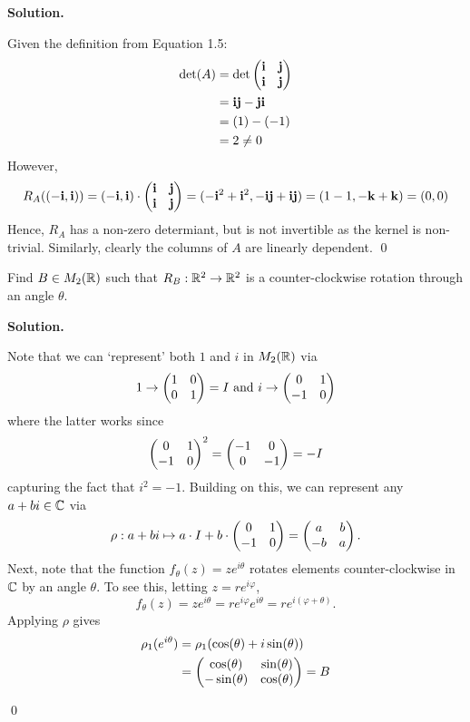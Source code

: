 \documentclass[12pt]{book}
\theoremstyle{definition}
\newenvironment{solution}
{%
  \par\noindent\textbf{Solution.}\quad
}
{%
  \qed\par
}
\begin{document}
\begin{solution}
  Given the definition from Equation 1.5:
  \[
    \begin{aligned}
      \det (A) &= \det \begin{pmatrix} \mathbf{i} & \mathbf{j} \\ \mathbf{i} & \mathbf{j} \end{pmatrix} \\
               &= \mathbf{i} \mathbf{j} - \mathbf{j} \mathbf{i} \\
               &= (1) - (-1) \\
               &= 2 \neq 0 \\
   \end{aligned}
  \]
  However,
  \[
  R_A((-\mathbf{i}, \mathbf{i})) = (-\mathbf{i}, \mathbf{i}) \cdot \begin{pmatrix} \mathbf{i} & \mathbf{j} \\ \mathbf{i} & \mathbf{j} \end{pmatrix} = (-\mathbf{i}^2 + \mathbf{i}^2, -\mathbf{i}\mathbf{j} + \mathbf{i}\mathbf{j}) = (1 - 1, -\mathbf{k} + \mathbf{k}) = (0, 0)
  \]
  Hence, $R_A$ has a non-zero determiant, but is not invertible as the kernel is non-trivial.
  Similarly, clearly the columns of $A$ are linearly dependent.
\end{solution}

\begin{taggedexercise}[\textcolor{green}{Complete}]
  Find $B \in M_2(\mathbb{R})$ such that $R_B : \mathbb{R}^2 \to \mathbb{R}^2$ is a counter-clockwise rotation through an angle $\theta$.
\end{taggedexercise}

\begin{solution}
  Note that we can `represent' both $1$ and $i$ in $M_2(\mathbb{R})$ via
  \[
  1 \to \begin{pmatrix} 1 & 0 \\ 0 & 1 \end{pmatrix} = I \text{ and } i \to \begin{pmatrix} 0 & 1 \\ -1 & 0 \end{pmatrix}
  \]
  where the latter works since
  \[
    \begin{pmatrix} 0 & 1 \\ -1 & 0 \end{pmatrix}^2 = \begin{pmatrix} -1 & 0 \\ 0 & -1 \end{pmatrix} = -I
  \]
  capturing the fact that $i^2 = -1$. 
  Building on this, we can represent any $a+bi \in \mathbb{C}$ via 
  \[
    \rho : a+bi\mapsto a \cdot I + b \cdot \begin{pmatrix} 0 & 1 \\ -1 & 0 \end{pmatrix} = \begin{pmatrix} a & b \\ -b & a \end{pmatrix}.
  \]
  Next, note that the function $f_\theta(z) = ze^{i\theta}$ rotates elements counter-clockwise in $\mathbb{C}$ by an angle $\theta$. 
  To see this, letting $z=re^{i\varphi}$,
  \[f_\theta(z) = ze^{i\theta} = re^{i\varphi}e^{i\theta} = re^{i(\varphi + \theta)}.\]
  Applying $\rho$ gives
  \[
  \begin{aligned}
    \rho_1(e^{i\theta}) &= \rho_1(\cos(\theta) + i\sin(\theta)) \\
                        &= \begin{pmatrix} \cos(\theta) & \sin(\theta) \\ -\sin(\theta) & \cos(\theta) \end{pmatrix} = B
  \end{aligned}
  \]


\end{solution}
\end{document}
